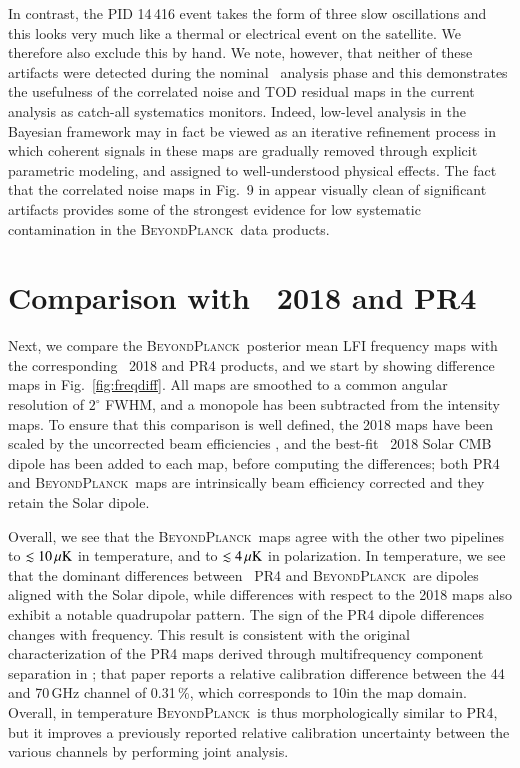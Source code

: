 \documentclass[twocolumn]{aa}
\newcommand{\BP}{\textsc{BeyondPlanck}}
\begin{document}
In contrast, the PID 14\,416 event takes the form of three slow
oscillations and this looks very much like a thermal or electrical event on the
satellite. We therefore also exclude this by hand. We note, however, that neither of these artifacts were detected during the nominal
\Planck\ analysis phase and this demonstrates the usefulness of the
correlated noise and TOD residual maps in the current analysis as
catch-all systematics monitors. Indeed, low-level analysis in the
Bayesian framework may in fact be viewed as an iterative refinement
process in which coherent signals in these maps are gradually removed
through explicit parametric modeling, and assigned to well-understood
physical effects. The fact that the correlated noise maps in Fig.~9 in
\citet{bp06} appear visually clean of significant artifacts provides
some of the strongest evidence for low systematic contamination in the
\BP\ data products.


\section{Comparison with \Planck\ 2018 and PR4}
\label{sec:comparison}

Next, we compare the \BP\ posterior mean LFI frequency maps with the
corresponding \Planck\ 2018 and PR4 products, and we start by showing
difference maps in Fig.~\ref{fig:freqdiff}. All maps are smoothed to a
common angular resolution of $2^{\circ}$ FWHM, and a monopole has been
subtracted from the intensity maps. To ensure that this comparison is
well defined, the 2018 maps have been scaled by the uncorrected beam
efficiencies \citep{planck2016-l02}, and the best-fit \Planck\ 2018 
Solar CMB dipole has been added to each map, before computing the differences; 
both PR4 and \BP\ maps are intrinsically beam efficiency corrected 
and they retain the Solar dipole.

Overall, we see that the \BP\ maps agree with the other two pipelines
to $\lesssim 10\muK$ in temperature, and to $\lesssim 4\muK$ in
polarization. In temperature, we see that the dominant differences
between \Planck\ PR4 and \BP\ are dipoles aligned with the Solar dipole,
while differences with respect to the 2018 maps also exhibit a notable
quadrupolar pattern. The sign of the PR4 dipole differences
changes with frequency. This result is consistent with the original
characterization of the PR4 maps derived through multifrequency
component separation in \citet{planck2020-LVII}; that paper reports a
relative calibration difference between the 44 and 70\,GHz channel of
0.31\,\%, which corresponds to 10\muK in the map domain. Overall, in
temperature \BP\ is thus morphologically similar to PR4, but it
improves a previously reported relative calibration uncertainty
between the various channels by performing joint analysis.
\end{document}
